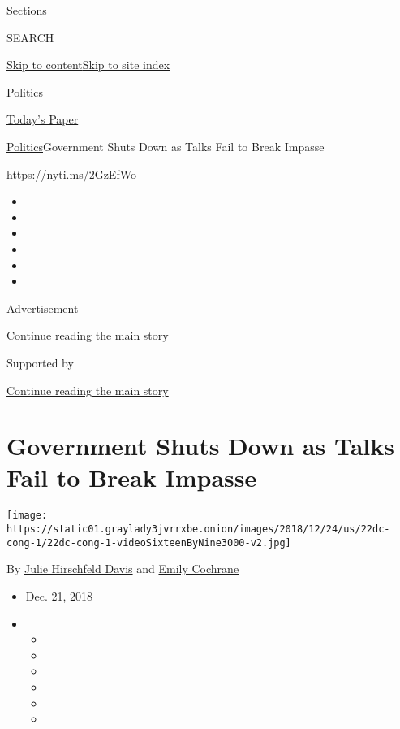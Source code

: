 Sections

SEARCH

\protect\hyperlink{site-content}{Skip to
content}\protect\hyperlink{site-index}{Skip to site index}

\href{https://www.nytimes3xbfgragh.onion/section/politics}{Politics}

\href{https://myaccount.nytimes3xbfgragh.onion/auth/login?response_type=cookie\&client_id=vi}{}

\href{https://www.nytimes3xbfgragh.onion/section/todayspaper}{Today's
Paper}

\href{/section/politics}{Politics}\textbar{}Government Shuts Down as
Talks Fail to Break Impasse

\url{https://nyti.ms/2GzEfWo}

\begin{itemize}
\item
\item
\item
\item
\item
\item
\end{itemize}

Advertisement

\protect\hyperlink{after-top}{Continue reading the main story}

Supported by

\protect\hyperlink{after-sponsor}{Continue reading the main story}

\hypertarget{government-shuts-down-as-talks-fail-to-break-impasse}{%
\section{Government Shuts Down as Talks Fail to Break
Impasse}\label{government-shuts-down-as-talks-fail-to-break-impasse}}

\texttt{[image: https://static01.graylady3jvrrxbe.onion/images/2018/12/24/us/22dc-cong-1/22dc-cong-1-videoSixteenByNine3000-v2.jpg]}

By
\href{https://www.nytimes3xbfgragh.onion/by/julie-hirschfeld-davis}{Julie
Hirschfeld Davis} and
\href{https://www.nytimes3xbfgragh.onion/by/emily-cochrane}{Emily
Cochrane}

\begin{itemize}
\item
  Dec. 21, 2018
\item
  \begin{itemize}
  \item
  \item
  \item
  \item
  \item
  \item
  \end{itemize}
\end{itemize}

